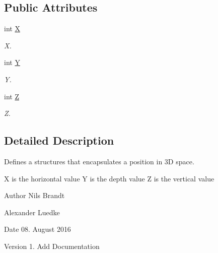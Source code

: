 \subsection*{Public Attributes}
\begin{DoxyCompactItemize}
\item 
\hypertarget{structVector3_a5f80efa843c99c88278519ab10ae412d}{int \hyperlink{structVector3_a5f80efa843c99c88278519ab10ae412d}{X}}\label{structVector3_a5f80efa843c99c88278519ab10ae412d}

\begin{DoxyCompactList}\small\item\em X. \end{DoxyCompactList}\item 
\hypertarget{structVector3_a91b07be62c81ec8b4627ddf3b47939af}{int \hyperlink{structVector3_a91b07be62c81ec8b4627ddf3b47939af}{Y}}\label{structVector3_a91b07be62c81ec8b4627ddf3b47939af}

\begin{DoxyCompactList}\small\item\em Y. \end{DoxyCompactList}\item 
\hypertarget{structVector3_a5565be8da409808f4367f2c992342c22}{int \hyperlink{structVector3_a5565be8da409808f4367f2c992342c22}{Z}}\label{structVector3_a5565be8da409808f4367f2c992342c22}

\begin{DoxyCompactList}\small\item\em Z. \end{DoxyCompactList}\end{DoxyCompactItemize}


\subsection{Detailed Description}
Defines a structures that encapsulates a position in 3\-D space. 

X is the horizontal value Y is the depth value Z is the vertical value

\begin{DoxyAuthor}{Author}
Nils Brandt 

Alexander Luedke
\end{DoxyAuthor}
\begin{DoxyDate}{Date}
08. August 2016
\end{DoxyDate}
\begin{DoxyVersion}{Version}
1. Add Documentation 
\end{DoxyVersion}


